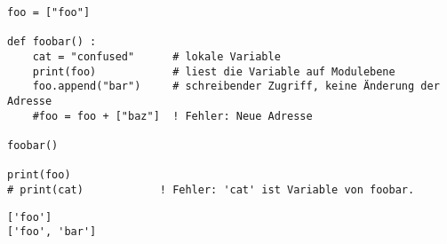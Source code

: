 
\begin{frame}[fragile]
%
\begin{codebox}
\begin{verbatim}
foo = ["foo"]

def foobar() :
    cat = "confused"      # lokale Variable
    print(foo)            # liest die Variable auf Modulebene
    foo.append("bar")     # schreibender Zugriff, keine Änderung der Adresse
    #foo = foo + ["baz"]  ! Fehler: Neue Adresse

foobar()

print(foo)
# print(cat)            ! Fehler: 'cat' ist Variable von foobar.
\end{verbatim}
\end{codebox}
\begin{cmdbox}
\begin{verbatim}
['foo']
['foo', 'bar']
\end{verbatim}
\end{cmdbox}
%
\end{frame}